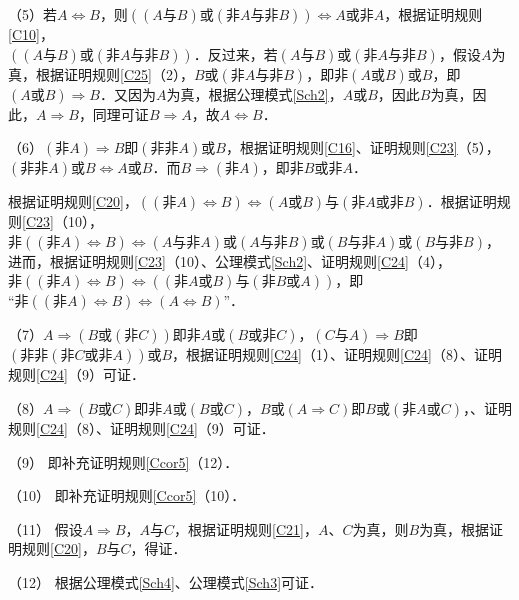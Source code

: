 \documentclass[12pt, a4paper, oneside]{book}
\begin{document}
			\par
			（5）若$A\Leftrightarrow B$，则$((A\text{与}B)\text{或}(\text{非}A\text{与}\text{非}B))\Leftrightarrow A\text{或}\text{非}A$，根据证明规则\ref{C10}，\\$((A\text{与}B)\text{或}(\text{非}A\text{与}\text{非}B))$．反过来，若$(A\text{与}B)\text{或}(\text{非}A\text{与}\text{非}B)$，假设$A$为真，根据证明规则\ref{C25}（2），$B\text{或}(\text{非}A\text{与}\text{非}B)$，即$\text{非}(A\text{或}B)\text{或}B$，即$(A\text{或}B)\Rightarrow B$．又因为$A$为真，根据公理模式\ref{Sch2}，$A\text{或}B$，因此$B$为真，因此，$A\Rightarrow B$，同理可证$B\Rightarrow A$，故$A\Leftrightarrow B$．
			\par
			（6）$(\text{非}A)\Rightarrow B$即$(\text{非}\text{非}A)\text{或}B$，根据证明规则\ref{C16}、证明规则\ref{C23}（5），$(\text{非}\text{非}A)\text{或}B\Leftrightarrow A\text{或}B$．而$B\Rightarrow (\text{非}A)$，即$\text{非}B\text{或}\text{非}A$．
			\par
			根据证明规则\ref{C20}，$((\text{非}A)\Leftrightarrow B)\Leftrightarrow (A\text{或}B)\text{与}(\text{非}A\text{或}\text{非}B)$．根据证明规则\ref{C23}（10），$\text{非}((\text{非}A)\Leftrightarrow B)\Leftrightarrow (A\text{与}\text{非}A)\text{或}(A\text{与}\text{非}B)\text{或}(B\text{与}\text{非}A)\text{或}(B\text{与}\text{非}B)$，进而，根据证明规则\ref{C23}（10）、公理模式\ref{Sch2}、证明规则\ref{C24}（4），$\text{非}((\text{非}A)\Leftrightarrow B)\Leftrightarrow ((\text{非}A\text{或}B)\text{与}(\text{非}B\text{或}A))$，即\\“$\text{非}((\text{非}A)\Leftrightarrow B)\Leftrightarrow (A\Leftrightarrow B)$”．
			\par
			（7）$A\Rightarrow (B\text{或}(\text{非}C))$即$\text{非}A\text{或}(B\text{或}\text{非}C)$，$(C\text{与}A)\Rightarrow B$即$(\text{非}\text{非}(\text{非}C\text{或}\text{非}A))\text{或}B$，根据证明规则\ref{C24}（1）、证明规则\ref{C24}（8）、证明规则\ref{C24}（9）可证．
			\par
			（8）$A\Rightarrow (B\text{或}C)$即$\text{非}A\text{或}(B\text{或}C)$，$B\text{或}(A\Rightarrow C)$即$B\text{或}(\text{非}A\text{或}C)$，、证明规则\ref{C24}（8）、证明规则\ref{C24}（9）可证．
			\par
			（9）	即补充证明规则\ref{Ccor5}（12）．
			\par
			（10）	即补充证明规则\ref{Ccor5}（10）．
			\par
			（11）	假设$A\Rightarrow B$，$A\text{与}C$，根据证明规则\ref{C21}，$A$、$C$为真，则$B$为真，根据证明规则\ref{C20}，$B\text{与}C$，得证．
			\par
			（12）	根据公理模式\ref{Sch4}、公理模式\ref{Sch3}可证．
			\par
	
\end{document}
